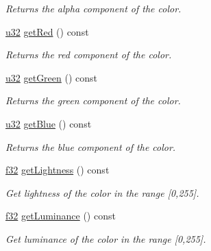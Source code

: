 \begin{DoxyCompactItemize}
\begin{DoxyCompactList}\small\item\em Returns the alpha component of the color. \end{DoxyCompactList}\item 
\hyperlink{namespaceirr_a0416a53257075833e7002efd0a18e804}{u32} \hyperlink{classirr_1_1video_1_1SColor_a70d11ec2247581c79ee11e0e1b511978}{get\+Red} () const
\begin{DoxyCompactList}\small\item\em Returns the red component of the color. \end{DoxyCompactList}\item 
\hyperlink{namespaceirr_a0416a53257075833e7002efd0a18e804}{u32} \hyperlink{classirr_1_1video_1_1SColor_a198773366f2a5436c1ca4adc9037bb8d}{get\+Green} () const
\begin{DoxyCompactList}\small\item\em Returns the green component of the color. \end{DoxyCompactList}\item 
\hyperlink{namespaceirr_a0416a53257075833e7002efd0a18e804}{u32} \hyperlink{classirr_1_1video_1_1SColor_afb60ac456b2efc2f2a4f04a643293d26}{get\+Blue} () const
\begin{DoxyCompactList}\small\item\em Returns the blue component of the color. \end{DoxyCompactList}\item 
\mbox{\label{classirr_1_1video_1_1SColor_aa0896808bbd22740a67f1badbebe1bca}} 
\hyperlink{namespaceirr_a0277be98d67dc26ff93b1a6a1d086b07}{f32} \hyperlink{classirr_1_1video_1_1SColor_aa0896808bbd22740a67f1badbebe1bca}{get\+Lightness} () const
\begin{DoxyCompactList}\small\item\em Get lightness of the color in the range \mbox{[}0,255\mbox{]}. \end{DoxyCompactList}\item 
\mbox{\label{classirr_1_1video_1_1SColor_a74510809a867a92c18696223e1130887}} 
\hyperlink{namespaceirr_a0277be98d67dc26ff93b1a6a1d086b07}{f32} \hyperlink{classirr_1_1video_1_1SColor_a74510809a867a92c18696223e1130887}{get\+Luminance} () const
\begin{DoxyCompactList}\small\item\em Get luminance of the color in the range \mbox{[}0,255\mbox{]}. \end{DoxyCompactList}\item 

\end{DoxyCompactItemize}

